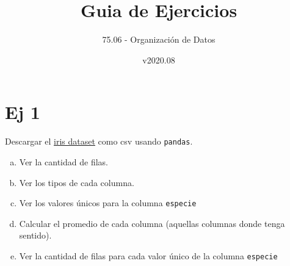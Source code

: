 \documentclass{article}
\title{Guia de Ejercicios}
\author{75.06 - Organización de Datos}
\date{v2020.08}
\begin{document}
\maketitle

\section{Ej 1}
Descargar el \href{https://gist.githubusercontent.com/CrossNox/6ea7fedb55bfb511449ba67d47d8e071/raw/3158919a26833fc8f2f3170b0e8a4d6f6cf09b8e/iris.csv}{iris dataset} como csv usando \texttt{pandas}.

\begin{enumerate}[a)]
\item Ver la cantidad de filas.
\item Ver los tipos de cada columna.
\item Ver los valores únicos para la columna \texttt{especie}
\item Calcular el promedio de cada columna (aquellas columnas donde tenga sentido).
\item Ver la cantidad de filas para cada valor único de la columna \texttt{especie}
\end{enumerate}
\end{document}
